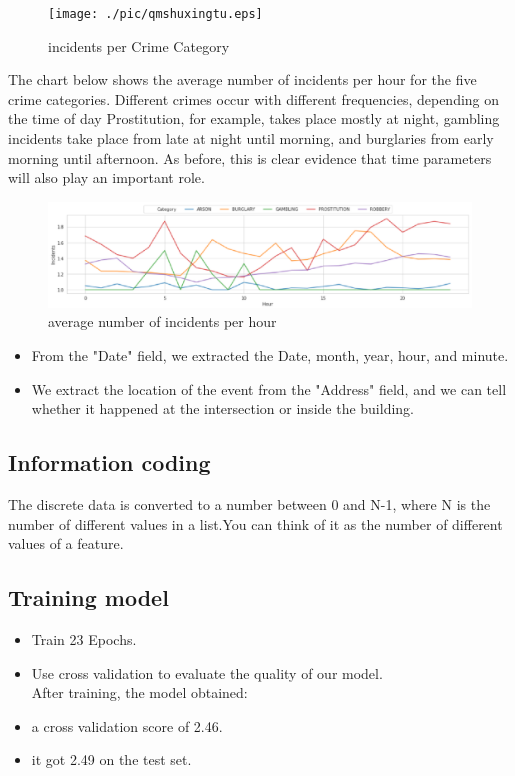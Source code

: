 \documentclass{amsart}
\begin{document}
\begin{figure}[htbp]
	\texttt{[image: ./pic/qmshuxingtu.eps]}
	\caption{incidents per Crime Category}
\end{figure}

	\hspace*{0.6cm}The chart below shows the average number of incidents per hour for the five crime categories.
	Different crimes occur with different frequencies, depending on the time of day
	Prostitution, for example, takes place mostly at night, gambling incidents take place from late at night until morning, and burglaries from early morning until afternoon.
	As before, this is clear evidence that time parameters will also play an important role.
	
	\begin{figure}[htbp]
		\includegraphics[scale=0.7]{./pic/qmzhexiantu.eps}
		\caption{average number of incidents per hour}
	\end{figure}

	\begin{itemize}
	\item From the "Date" field, we extracted the Date, month, year, hour, and minute.
	\item We extract the location of the event from the "Address" field, and we can tell whether it happened at the intersection or inside the building.
\end{itemize}

\subsection{Information coding}
	The discrete data is converted to a number between 0 and N-1, where N is the number of different values in a list.You can think of it as the number of different values of a feature.\\

\subsection{Training model}
	\begin{itemize}
		\item Train 23 Epochs.
		\item Use cross validation to evaluate the quality of our model.\\
		After training, the model obtained:
		\item a cross validation score of 2.46.
		\item it got 2.49 on the test set.
	\end{itemize}
\end{document}
